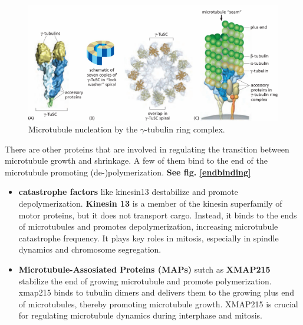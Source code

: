 \documentclass[../main.tex]{subfiles}
\begin{document}
\begin{figure}[H]
	\centering
	\includegraphics[width = 0.7 \textwidth]{25}
	\caption{Microtubule nucleation by the $\gamma$-tubulin ring complex.}
\end{figure}


There are other proteins that are involved in regulating the transition between microtubule growth and shrinkage. A few of them bind to the end of the microtubule promoting (de-)polymerization. \textbf{See fig. \ref{endbinding}}
\begin{itemize}
	\item \textbf{catastrophe factors} like \gls{kinesin13} destabilize and promote depolymerization. \textbf{Kinesin 13} is a member of the kinesin superfamily of motor proteins, but it does not transport cargo. Instead, it binds to the ends of microtubules and promotes depolymerization, increasing microtubule catastrophe frequency. It plays key roles in mitosis, especially in spindle dynamics and chromosome segregation.
	
	\item \textbf{Microtubule-Assosiated Proteins (MAPs)} sutch as \textbf{XMAP215} stabilize the end of growing microtubule and promote polymerization. \gls{xmap215} binds to tubulin dimers and delivers them to the growing plus end of microtubules, thereby promoting microtubule growth. XMAP215 is crucial for regulating microtubule dynamics during interphase and mitosis. 
\end{itemize}
 
\end{document}
